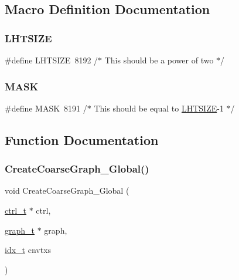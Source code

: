 \subsection{Macro Definition Documentation}
\mbox{\label{a00368_a5beea06370d4f56022dd890e2a1ab444}} 
\subsubsection{\texorpdfstring{L\+H\+T\+S\+I\+ZE}{LHTSIZE}}
{\footnotesize\ttfamily \#define L\+H\+T\+S\+I\+ZE~8192 /$\ast$ This should be a power of two $\ast$/}

\mbox{\label{a00368_ae7520c5477c11965aabeedc033c9862b}} 
\subsubsection{\texorpdfstring{M\+A\+SK}{MASK}}
{\footnotesize\ttfamily \#define M\+A\+SK~8191 /$\ast$ This should be equal to \hyperlink{a00368_a5beea06370d4f56022dd890e2a1ab444}{L\+H\+T\+S\+I\+ZE}-\/1 $\ast$/}



\subsection{Function Documentation}
\mbox{\label{a00368_afe6fa9bdcdc3b227b06b992caf2aaec4}} 
\subsubsection{\texorpdfstring{Create\+Coarse\+Graph\+\_\+\+Global()}{CreateCoarseGraph\_Global()}}
{\footnotesize\ttfamily void Create\+Coarse\+Graph\+\_\+\+Global (\begin{DoxyParamCaption}\item[{\hyperlink{a00742}{ctrl\+\_\+t} $\ast$}]{ctrl,  }\item[{\hyperlink{a00734}{graph\+\_\+t} $\ast$}]{graph,  }\item[{\hyperlink{a00876_aaa5262be3e700770163401acb0150f52}{idx\+\_\+t}}]{cnvtxs }\end{DoxyParamCaption})}

